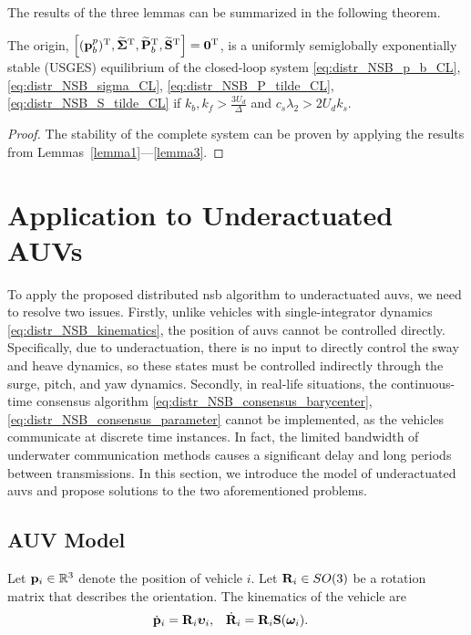 The results of the three lemmas can be summarized in the following theorem.
\begin{theorem}
    \label{thm_distr_NSB}
    The origin, $\left[(\mathbf{p}_b^p)^{\mathrm{T}}, \widetilde{\bm{\Sigma}}^{\mathrm{T}}, \widetilde{\mathbf{P}}_b^{\mathrm{T}}, \widetilde{\mathbf{S}}^{\mathrm{T}}\right] = \mathbf{0}^{\mathrm{T}}$, is a uniformly semiglobally exponentially stable (USGES) equilibrium of the closed-loop system \eqref{eq:distr_NSB_p_b_CL}, \eqref{eq:distr_NSB_sigma_CL}, \eqref{eq:distr_NSB_P_tilde_CL}, \eqref{eq:distr_NSB_S_tilde_CL} if $k_b, k_f > \frac{3U_d}{\Delta}$ and $c_s \lambda_2 > 2 U_d k_s$.
\end{theorem}
\begin{proof}
    The stability of the complete system can be proven by applying the results from Lemmas~\ref{lemma1}---\ref{lemma3}.
\end{proof}

\section{Application to Underactuated AUVs}
\label{sec:distr_NSB_AUV}
To apply the proposed distributed \gls{nsb} algorithm to underactuated \glspl{auv}, we need to resolve two issues.
Firstly, unlike vehicles with single-integrator dynamics \eqref{eq:distr_NSB_kinematics}, the position of \glspl{auv} cannot be controlled directly.
Specifically, due to underactuation, there is no input to directly control the sway and heave dynamics, so these states must be controlled indirectly through the surge, pitch, and yaw dynamics.
Secondly, in real-life situations, the continuous-time consensus algorithm \eqref{eq:distr_NSB_consensus_barycenter}, \eqref{eq:distr_NSB_consensus_parameter} cannot be implemented, as the vehicles communicate at discrete time instances.
In fact, the limited bandwidth of underwater communication methods causes a significant delay and long periods between transmissions.
In this section, we introduce the model of underactuated \glspl{auv} and propose solutions to the two aforementioned problems.

\subsection{AUV Model}
Let $\mathbf{p}_i \in \mathbb{R}^3$ denote the position of vehicle $i$.
Let $\mathbf{R}_i \in SO(3)$ be a rotation matrix that describes the orientation.
The kinematics of the vehicle are \cite{fossen_handbook_2011}
\begin{align}
    \dot{\mathbf{p}}_i &= \mathbf{R}_i \bm{\upsilon}_i, &
    \dot{\mathbf{R}}_i &= \mathbf{R}_i \mathbf{S}(\bm{\omega}_i).
    \label{eq:distr_NSB_AUV_kinematic}
\end{align}

